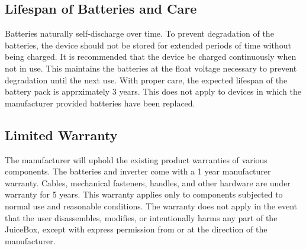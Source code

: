 \documentclass[../jb_user_manual.tex]{subfiles}
\begin{document}
\subsection{\Large{Lifespan of Batteries and Care}}

Batteries naturally self-discharge over time.  To prevent degradation of the batteries, the device should not be stored for extended periods of time without being charged.  It is recommended that the device be charged continuously when not in use.  This maintains the batteries at the float voltage necessary to prevent degradation until the next use.  With proper care, the expected lifespan of the battery pack is apprximately 3 years.  This does not apply to devices in which the manufacturer provided batteries have been replaced.

\subsection{\Large{Limited Warranty}}

The manufacturer will uphold the existing product warranties of various components.  The batteries and inverter come with a 1 year manufacturer warranty.  Cables, mechanical fasteners, handles, and other hardware are under warranty for 5 years.  This warranty applies only to components subjected to normal use and reasonable conditions.  The warranty does not apply in the event that the user disassembles, modifies, or intentionally harms any part of the JuiceBox, except with express permission from or at the direction of the manufacturer.
\end{document}
